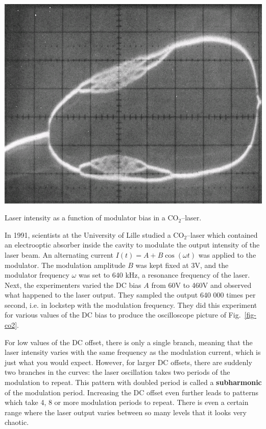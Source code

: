 \begin{marginfigure}
\centering
\includegraphics{dynamic/figures/CO2_chaos}
\caption{Laser intensity as a function of modulator bias in a CO$_2$--laser.}
\label{fig-co2}
\end{marginfigure}

In 1991, scientists at the University of Lille studied a CO$_2$--laser which contained an electrooptic absorber inside the cavity to modulate the output intensity of the laser beam. An alternating current $I(t)=A+B \cos (\omega t)$ was applied to the modulator. The modulation amplitude $B$ was kept fixed at 3V, and the modulator frequency $\omega$ was set to 640 kHz, a resonance frequency of the laser. Next, the experimenters varied the DC bias $A$ from 60V to 460V and observed what happened to the laser output. They sampled the output 640 000 times per second, i.e. in lockstep with the modulation frequency. They did this experiment for various values of the DC bias to produce the oscilloscope picture of Fig.~\ref{fig-co2}.

For low values of the DC offset, there is only a single branch, meaning that the laser intensity varies with the same frequency as the modulation current, which is just what you would expect. However, for larger DC offsets, there are suddenly two branches in the curves: the laser oscillation takes two periods of the modulation to repeat. This pattern with doubled period is called a \textbf{subharmonic} of the modulation period. Increasing the DC offset even further leads to patterns which take 4, 8 or more modulation periods to repeat. There is even a certain range where the laser output varies between so many levels that it looks very chaotic.

